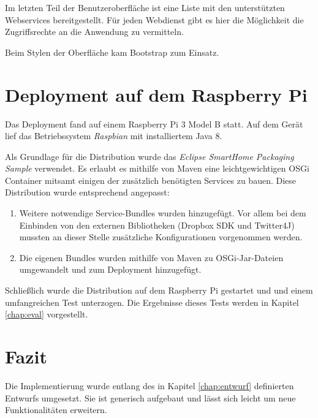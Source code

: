 Im letzten Teil der Benutzeroberfläche ist eine Liste mit den unterstützten Webservices bereitgestellt. Für jeden Webdienst gibt es hier die Möglichkeit die Zugriffsrechte an die Anwendung zu vermitteln.

Beim Stylen der Oberfläche kam Bootstrap\cite{bootstrap} zum Einsatz.


\section{Deployment auf dem Raspberry Pi}
\label{impl:deployment}
Das Deployment fand auf einem Raspberry Pi 3 Model B statt. Auf dem Gerät lief das Betriebssystem \textit{Raspbian} mit installiertem Java 8.

Als Grundlage für die Distribution wurde das \textit{Eclipse SmartHome Packaging Sample}\cite{eshsample} verwendet. Es erlaubt es mithilfe von Maven\cite{maven} eine leichtgewichtigen OSGi Container mitsamt einigen der zusätzlich benötigten Services zu bauen. Diese Distribution wurde entsprechend angepasst: 
\begin{enumerate}
\item Weitere notwendige Service-Bundles wurden hinzugefügt. Vor allem bei dem Einbinden von den externen Bibliotheken (Dropbox SDK und Twitter4J) mussten an dieser Stelle zusätzliche Konfigurationen vorgenommen werden.
\item Die eigenen Bundles wurden mithilfe von Maven zu OSGi-Jar-Dateien umgewandelt und zum Deployment hinzugefügt.
\end{enumerate}

Schließlich wurde die Distribution auf dem Raspberry Pi gestartet und und einem umfangreichen Test unterzogen. Die Ergebnisse dieses Tests werden in Kapitel \ref{chap:eval} vorgestellt.


\section{Fazit}
Die Implementierung wurde entlang des in Kapitel \ref{chap:entwurf} definierten Entwurfs umgesetzt. Sie ist generisch aufgebaut und lässt sich leicht um neue Funktionalitäten erweitern.
